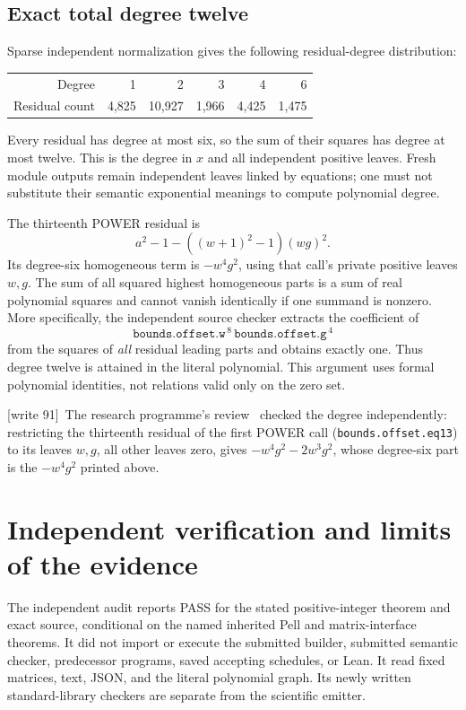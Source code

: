 \documentclass[11pt,letterpaper]{article}
\theoremstyle{definition}
\theoremstyle{remark}
\newcommand{\wtagd}{\textup{[write 91]}}
\begin{document}
\subsection{Exact total degree twelve}
Sparse independent normalization gives the following residual-degree distribution:
\begin{center}
\begin{tabular}{rrrrrr}
\toprule
Degree & 1 & 2 & 3 & 4 & 6\\
Residual count & 4,825 & 10,927 & 1,966 & 4,425 & 1,475\\
\bottomrule
\end{tabular}
\end{center}
Every residual has degree at most six, so the sum of their squares has degree at most twelve. This is the degree in $x$ and all independent positive leaves. Fresh module outputs remain independent leaves linked by equations; one must not substitute their semantic exponential meanings to compute polynomial degree.

The thirteenth POWER residual is
\[
 a^2-1-((w+1)^2-1)(wg)^2.
\]
Its degree-six homogeneous term is $-w^4g^2$, using that call's private positive leaves $w,g$. The sum of all squared highest homogeneous parts is a sum of real polynomial squares and cannot vanish identically if one summand is nonzero. More specifically, the independent source checker extracts the coefficient of
\[
 \texttt{bounds.offset.w}^{\,8}\,
 \texttt{bounds.offset.g}^{\,4}
\]
from the squares of \emph{all} residual leading parts and obtains exactly one. Thus degree twelve is attained in the literal polynomial. This argument uses formal polynomial identities, not relations valid only on the zero set.

\wtagd\ The research programme's review~\cite{repo-revcm} checked the degree independently: restricting the thirteenth residual of the first POWER call (\texttt{bounds.offset.eq13}) to its leaves $w,g$, all other leaves zero, gives $-w^4g^2-2w^3g^2$, whose degree-six part is the $-w^4g^2$ printed above.

\section{Independent verification and limits of the evidence}
\label{gts:cm:sec:audit}
The independent audit \cite{cm-audit} reports PASS for the stated positive-integer theorem and exact source, conditional on the named inherited Pell and matrix-interface theorems. It did not import or execute the submitted builder, submitted semantic checker, predecessor programs, saved accepting schedules, or Lean. It read fixed matrices, text, JSON, and the literal polynomial graph. Its newly written standard-library checkers are separate from the scientific emitter.
\end{document}
